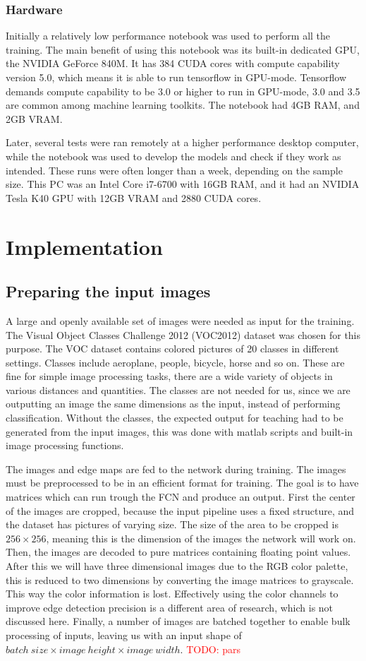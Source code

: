 \documentclass[12pt]{report}
\newcommand\todo[1]{\textcolor{red}{#1}}
\begin{document}
\subsection{Hardware}
Initially a relatively low performance notebook was used to perform all the training. The main benefit of using this notebook was its built-in dedicated GPU, the NVIDIA GeForce 840M. It has 384 CUDA cores with compute capability version 5.0, which means it is able to run tensorflow in GPU-mode. Tensorflow demands compute capability to be 3.0 or higher to run in GPU-mode, 3.0 and 3.5 are common among machine learning toolkits. The notebook had 4GB RAM, and 2GB VRAM.

Later, several tests were ran remotely at a higher performance desktop computer, while the notebook was used to develop the models and check if they work as intended. These runs were often longer than a week, depending on the sample size. This PC was an Intel Core i7-6700 with 16GB RAM, and it had an NVIDIA Tesla K40 GPU with 12GB VRAM and 2880 CUDA cores.
\chapter{Implementation}
\section{Preparing the input images}
A large and openly available set of images were needed as input for the training. The Visual Object Classes Challenge 2012 (VOC2012) dataset \cite{pascal-voc-2012} was chosen for this purpose. The VOC dataset contains colored pictures of 20 classes in different settings. Classes include aeroplane, people, bicycle, horse and so on. These are fine for simple image processing tasks, there are a wide variety of objects in various distances and quantities. The classes are not needed for us, since we are outputting an image the same dimensions as the input, instead of performing classification. Without the classes, the expected output for teaching had to be generated from the input images, this was done with matlab scripts and built-in image processing functions.

The images and edge maps are fed to the network during training. The images must be preprocessed to be in an efficient format for training. The goal is to have matrices which can run trough the FCN and produce an output. First the center of the images are cropped, because the input pipeline uses a fixed structure, and the dataset has pictures of varying size. The size of the area to be cropped is $256×256$, meaning this is the dimension of the images the network will work on. Then, the images are decoded to pure matrices containing floating point values. After this we will have three dimensional images due to the RGB color palette, this is reduced to two dimensions by converting the image matrices to grayscale. This way the color information is lost. Effectively using the color channels to improve edge detection precision is a different area of research, which is not discussed here. Finally, a number of images are batched together to enable bulk processing of inputs, leaving us with an input shape of $ batch\ size × image\ height × image\ width $. \todo{TODO: pars}
\end{document}
